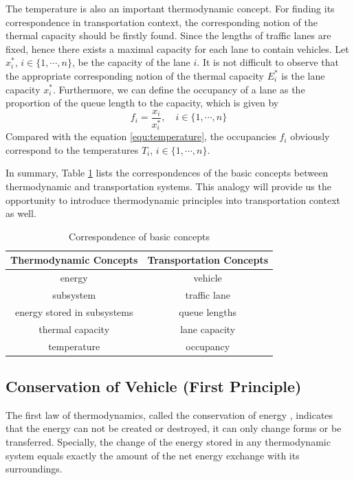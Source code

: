 \documentclass[preprint,authoryear,12pt]{elsarticle}
\begin{document}
The temperature is also an important thermodynamic concept. For finding its correspondence in transportation context, the corresponding notion of the thermal capacity should be firstly found. Since the lengths of traffic lanes are fixed, hence there exists a maximal capacity for each lane to contain vehicles. Let $x_i^*$, $i\in\{1,\cdots,n\}$, be the capacity of the lane $i$. It is not difficult to observe that the appropriate corresponding notion of the thermal capacity $E_i^*$ is the lane capacity $x_i^*$. Furthermore, we can define the occupancy of a lane as the proportion of the queue length to the capacity, which is given by
\begin{equation}\label{equ:occupancy}
f_i = \frac{x_i}{x_i^*},\quad i\in\{1,\cdots,n\}
\end{equation}
Compared with the equation \eqref{equ:temperature}, the occupancies $f_i$ obviously correspond to the temperatures $T_i$, $i\in\{1,\cdots,n\}$.

In summary, Table \ref{tab:notions} lists the correspondences of the basic concepts between thermodynamic and transportation systems. This analogy will provide us the opportunity to introduce thermodynamic principles into transportation context as well.

\begin{table}[ht]
\centering \caption{Correspondence of basic concepts}
\label{tab:notions}
\begin{tabular}{cc}
  \hline
  Thermodynamic Concepts & Transportation Concepts \\
  \hline
  energy & vehicle \\
  subsystem & traffic lane \\
  energy stored in subsystems & queue lengths \\
  thermal capacity & lane capacity \\
  temperature & occupancy \\
  \hline
\end{tabular}
\end{table}

\subsection{Conservation of Vehicle (First Principle)}

The first law of thermodynamics, called the conservation of energy \citep{cengel_thermodynamics:_2001}, indicates that the energy can not be created or destroyed, it can only change forms or be transferred. Specially, the change of the energy stored in any thermodynamic system equals exactly the amount of the net energy exchange with its surroundings.
\end{document}
